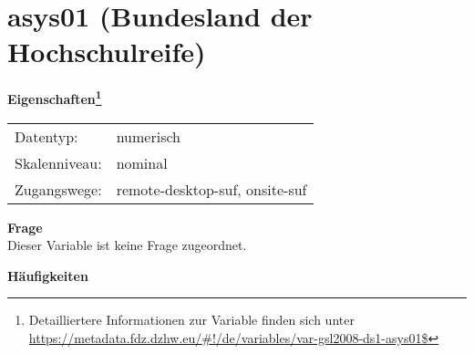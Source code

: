 
    \setcounter{footnote}{0}

    \vspace*{-1.8cm}
	\section{asys01 (Bundesland der Hochschulreife)}
	\label{section:asys01}



    \vspace*{0.5cm}
    \noindent\textbf{Eigenschaften\footnote{Detailliertere Informationen zur Variable finden sich unter
		\url{https://metadata.fdz.dzhw.eu/\#!/de/variables/var-gsl2008-ds1-asys01$}}}\\
	\begin{tabularx}{\hsize}{@{}lX}
	Datentyp: & numerisch \\
	Skalenniveau: & nominal \\
	Zugangswege: &
	  remote-desktop-suf, 
	  onsite-suf
 \\
    \end{tabularx}



		\vspace*{0.5cm}
		\noindent\textbf{Frage}\\
		Dieser Variable ist keine Frage zugeordnet.





        		\vspace*{0.5cm}
                \noindent\textbf{Häufigkeiten}

